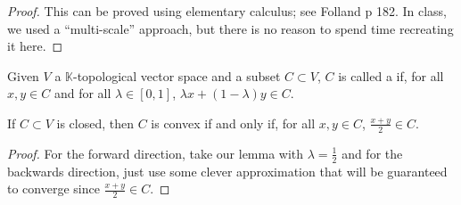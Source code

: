 \documentclass[11pt,leqno,oneside]{amsbook}
\numberwithin{thm}{section}
\newcommand{\K}{\mathbb{K}} %
\begin{document}
\begin{proof}
  This can be proved using elementary calculus; see Folland p 182. In class, we used a
  ``multi-scale'' approach, but there is no reason to spend time
  recreating it here.
\end{proof}
\begin{defn}
  Given \(V\) a \(\K\)-topological vector space and a subset \(C
  \subset V\), \(C\) is called a  if, for all \(x,y
  \in C\) and for all \(\lambda \in [0,1]\), \(\lambda x +
  (1-\lambda)y \in C\).
\end{defn}
\begin{prop}
  If \(C \subset V\) is closed, then \(C\) is convex if and only if,
  for all \(x,y \in C\), \(\frac{x+y}{2} \in C\).
\end{prop}
\begin{proof}
  For the forward direction, take our lemma with \(\lambda =
  \frac{1}{2}\) and for the backwards direction, just use some clever
  approximation that will be guaranteed to converge since
  \(\frac{x+y}{2} \in C\).
\end{proof}
\end{document}
